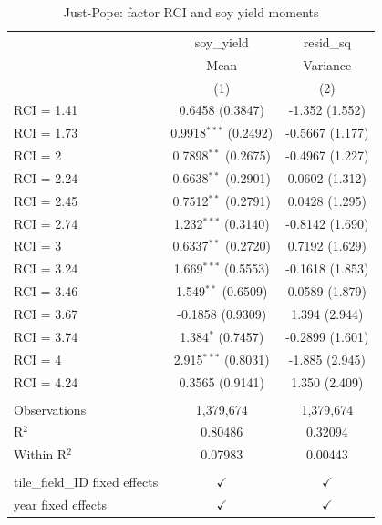 
\begin{table}[H]
   \caption{\label{tab:soy_rci_jp} Just-Pope: factor RCI and soy yield moments}
   \bigskip
   \centering
   \begin{tabular}{lcc}
      \toprule
                                      & soy\_yield              & resid\_sq\\   
                                      & Mean                    & Variance \\   
                                      & (1)                     & (2)\\  
      \midrule 
      RCI = 1.41                      & 0.6458 (0.3847)         & -1.352 (1.552)\\   
      RCI = 1.73                      & 0.9918$^{***}$ (0.2492) & -0.5667 (1.177)\\   
      RCI = 2                         & 0.7898$^{**}$ (0.2675)  & -0.4967 (1.227)\\   
      RCI = 2.24                      & 0.6638$^{**}$ (0.2901)  & 0.0602 (1.312)\\   
      RCI = 2.45                      & 0.7512$^{**}$ (0.2791)  & 0.0428 (1.295)\\   
      RCI = 2.74                      & 1.232$^{***}$ (0.3140)  & -0.8142 (1.690)\\   
      RCI = 3                         & 0.6337$^{**}$ (0.2720)  & 0.7192 (1.629)\\   
      RCI = 3.24                      & 1.669$^{***}$ (0.5553)  & -0.1618 (1.853)\\   
      RCI = 3.46                      & 1.549$^{**}$ (0.6509)   & 0.0589 (1.879)\\   
      RCI = 3.67                      & -0.1858 (0.9309)        & 1.394 (2.944)\\   
      RCI = 3.74                      & 1.384$^{*}$ (0.7457)    & -0.2899 (1.601)\\   
      RCI = 4                         & 2.915$^{***}$ (0.8031)  & -1.885 (2.945)\\   
      RCI = 4.24                      & 0.3565 (0.9141)         & 1.350 (2.409)\\   
       \\
      Observations                    & 1,379,674               & 1,379,674\\  
      R$^2$                           & 0.80486                 & 0.32094\\  
      Within R$^2$                    & 0.07983                 & 0.00443\\  
       \\
      tile\_field\_ID fixed effects   & $\checkmark$            & $\checkmark$\\   
      year fixed effects              & $\checkmark$            & $\checkmark$\\   
      \bottomrule
   \end{tabular}
\end{table}



